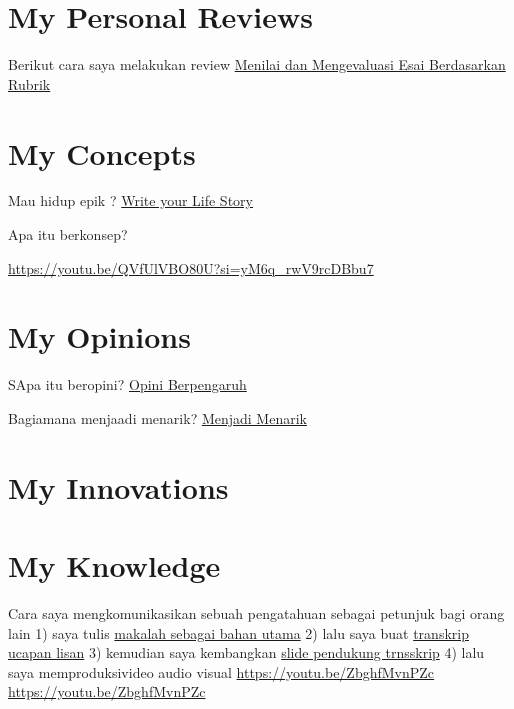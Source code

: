 \documentclass[
  letterpaper,
  DIV=11,
  numbers=noendperiod]{scrreprt}
\begin{document}
\chapter{My Personal Reviews}\label{my-personal-reviews}

Berikut cara saya melakukan review
\href{./Doc.5.Mengevaluasi-Esai-Berdasarkan-Rubrik.pdf}{Menilai dan
Mengevaluasi Esai Berdasarkan Rubrik}


\chapter{My Concepts}\label{my-concepts}

Mau hidup epik ? \href{lifestory.pdf}{Write your Life Story}

Apa itu berkonsep?

\url{https://youtu.be/QVfUlVBO80U?si=yM6q_rwV9rcDBbu7}


\chapter{My Opinions}\label{my-opinions}

SApa itu beropini? \href{BM\%20Opini.mp4}{Opini Berpengaruh}

Bagiamana menjaadi menarik? \href{./Interesting.mp4}{Menjadi Menarik}


\chapter{My Innovations}\label{my-innovations}


\chapter{My Knowledge}\label{my-knowledge}

Cara saya mengkomunikasikan sebuah pengatahuan sebagai petunjuk bagi
orang lain 1) saya tulis
\href{Rekomendasi\%20Presentasi\%20Efektif(Contoh\%20Makalah).pdf}{makalah
sebagai bahan utama} 2) lalu saya buat
\href{Contoh\%20Transkrip\%20Presentasi.pdf}{transkrip ucapan lisan} 3)
kemudian saya kembangkan
\href{Rekomendasi\%20Presentasi\%20(Contoh\%20Slides).pdf}{slide
pendukung trnsskrip} 4) lalu saya memproduksivideo audio visual
\url{https://youtu.be/ZbghfMvnPZc} \url{https://youtu.be/ZbghfMvnPZc}
\end{document}
